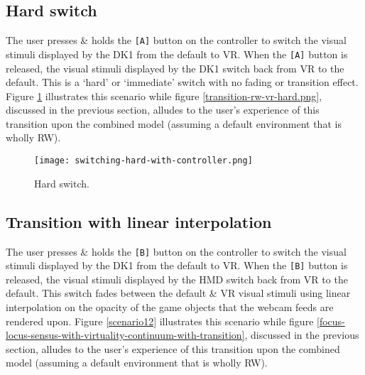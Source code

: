 
\subsection{Hard switch}
\label{sub-hardswitch}
The user presses \& holds the \texttt{[A]} button on the controller to switch the visual stimuli displayed by the DK1 from the default to VR. When the \texttt{[A]} button is released, the visual stimuli displayed by the DK1 switch back from VR to the default. This is a `hard' or `immediate' switch with no fading or transition effect. Figure \ref{scenario1} illustrates this scenario while figure \ref{transition-rw-vr-hard.png}, discussed in the previous section, alludes to the user's experience of this transition upon the combined model (assuming a default environment that is wholly RW).

\begin{figure}[h]
	\begin{center}
		\texttt{[image: switching-hard-with-controller.png]}
		\caption{Hard switch.}
		\label{scenario1}
	\end{center}
\end{figure}


\pagebreak


\subsection{Transition with linear interpolation}
\label{transition-with-linear-interpolation}
The user presses \& holds the \texttt{[B]} button on the controller to switch the visual stimuli displayed by the DK1 from the default to VR. When the \texttt{[B]} button is released, the visual stimuli displayed by the HMD switch back from VR to the default. This switch fades between the default \& VR  visual stimuli using linear interpolation on the opacity of the game objects that the webcam feeds are rendered upon. Figure \ref{scenario12} illustrates this scenario while figure \ref{focus-locus-sensus-with-virtuality-continuum-with-transition}, discussed in the previous section, alludes to the user's experience of this transition upon the combined model (assuming a default environment that is wholly RW).

